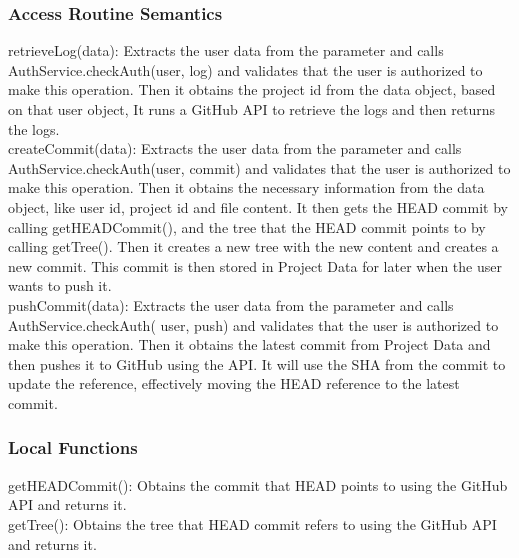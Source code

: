 \documentclass[12pt, titlepage]{article}
\begin{document}
	\subsubsection{Access Routine Semantics}
	
	\noindent retrieveLog(data): Extracts the user data from the parameter and calls AuthService.checkAuth(user, log) and validates that the user is authorized to make this operation. Then it obtains the project id from the data object, based on that user object, It runs a GitHub API to retrieve the logs and then returns the logs. \\
	
	\noindent createCommit(data): Extracts the user data from the parameter and calls AuthService.checkAuth(user, commit) and validates that the user is authorized to make this operation. Then it obtains the necessary information from the data object, like user id, project id and file content. It then gets the HEAD commit by calling getHEADCommit(), and the tree that the HEAD commit points to by calling getTree(). Then it creates a new tree with the new content and creates a new commit. This commit is then stored in Project Data for later when the user wants to push it.  \\
	
	\noindent pushCommit(data): Extracts the user data from the parameter and calls AuthService.checkAuth( user, push) and validates that the user is authorized to make this operation. Then it obtains the latest commit from Project Data and then pushes it to GitHub using the API. It will use the SHA from the commit to update the reference, effectively moving the HEAD reference to the latest commit. \\
	
	\subsubsection{Local Functions}
	
	\noindent getHEADCommit(): Obtains the commit that HEAD points to using the GitHub API and returns it. \\
	
	\noindent getTree(): Obtains the tree that HEAD commit refers to using the GitHub API and returns it. \\
	
	\newpage
	
	
\end{document}
